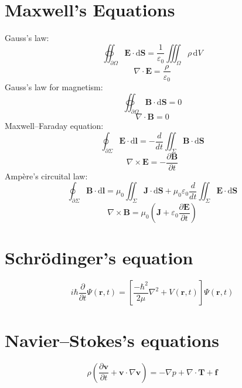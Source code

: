\documentclass[12pt]{article}
\begin{document}
\section{Maxwell's Equations}
Gauss's law:
$$ \oiint_{\scriptstyle\partial \Omega} \mathbf{E} \cdot \mathrm{d} \mathbf{S}
= \frac{1}{\varepsilon_0} \iiint_\Omega \rho \,\mathrm{d}V $$
$$ \nabla \cdot \mathbf{E} = \frac {\rho} {\varepsilon_0} $$
%
Gauss's law for magnetism:
$$ \oiint_{\scriptstyle\partial \Omega} \mathbf{B} \cdot \mathrm{d} \mathbf{S} = 0 $$
$$\nabla \cdot \mathbf{B} = 0$$
%
Maxwell–Faraday equation:
$$ \oint_{\partial \Sigma} \mathbf{E} \cdot \mathrm{d} \mathbf{l}
= - \frac{d}{dt} \iint_{\Sigma} \mathbf{B} \cdot \mathrm{d} \mathbf{S} $$
$$ \nabla \times \mathbf{E} = - \frac{\partial \mathbf{B}}{\partial t} $$
%
Ampère's circuital law:
$$ \oint_{\partial \Sigma} \mathbf{B} \cdot \mathrm{d} \mathbf{l}
= \mu_0 \iint_{\Sigma} \mathbf{J} \cdot \mathrm{d} \mathbf{S}
+ \mu_0 \varepsilon_0 \frac{d}{dt} \iint_{\Sigma} \mathbf{E} \cdot \mathrm{d} \mathbf{S} $$
$$ \nabla \times \mathbf{B}
= \mu_0 \left( \mathbf{J} + \varepsilon_0 \frac{\partial \mathbf{E}} {\partial t} \right) $$

\section{Schrödinger's equation}
$$ i \hbar \frac{\partial}{\partial t} \Psi(\mathbf{r},t)
= \left[ \frac{-\hbar^2}{2\mu}\nabla^2 + V(\mathbf{r},t) \right] \Psi(\mathbf{r},t) $$

\section{Navier–Stokes's equations}
$$ \rho \left( \frac{\partial \mathbf{v}}{\partial t} + \mathbf{v} \cdot \nabla \mathbf{v} \right)
= -\nabla p + \nabla \cdot \mathbf{T} + \mathbf{f} $$
\end{document}
